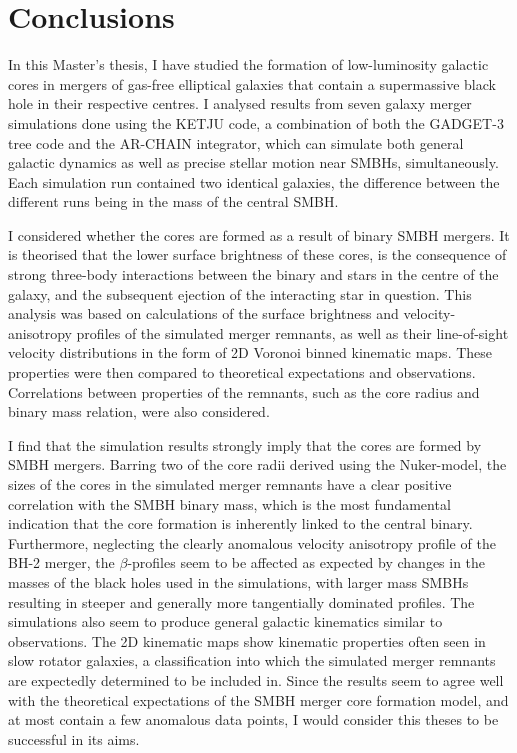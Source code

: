 \documentclass[english, twoside]{HYgradu}
\begin{document}
\begin{figure}
	\label{figure:profile_comparison}
\end{figure}


\chapter{Conclusions} \label{chapter:5}

In this Master's thesis, I have studied the formation of low-luminosity galactic cores in mergers of gas-free elliptical galaxies that contain a supermassive black hole in their respective centres. I analysed results from seven galaxy merger simulations done using the KETJU code, a combination of both the GADGET-3 tree code and the AR-CHAIN integrator, which can simulate both general galactic dynamics as well as precise stellar motion near SMBHs, simultaneously. Each simulation run contained two identical galaxies, the difference between the different runs being in the mass of the central SMBH. 

I considered whether the cores are formed as a result of binary SMBH mergers. It is theorised that the lower surface brightness of these cores, is the consequence of strong three-body interactions between the binary and stars in the centre of the galaxy, and the subsequent ejection of the interacting star in question. This analysis was based on calculations of the surface brightness and velocity-anisotropy profiles of the simulated merger remnants, as well as their line-of-sight velocity distributions in the form of 2D Voronoi binned kinematic maps. These properties were then compared to theoretical expectations and observations. Correlations between properties of the remnants, such as the core radius and binary mass relation, were also considered.

I find that the simulation results strongly imply that the cores are formed by SMBH mergers. Barring two of the core radii derived using the Nuker-model, the sizes of the cores in the simulated merger remnants have a clear positive correlation with the SMBH binary mass, which is the most fundamental indication that the core formation is inherently linked to the central binary. Furthermore, neglecting the clearly anomalous velocity anisotropy profile of the BH-2 merger, the $\beta$-profiles seem to be affected as expected by changes in the masses of the black holes used in the simulations, with larger mass SMBHs resulting in steeper and generally more tangentially dominated profiles. The simulations also seem to produce general galactic kinematics similar to observations. The 2D kinematic maps show kinematic properties often seen in slow rotator galaxies, a classification into which the simulated merger remnants are expectedly determined to be included in. Since the results seem to agree well with the theoretical expectations of the SMBH merger core formation model, and at most contain a few anomalous data points, I would consider this theses to be successful in its aims.
\end{document}
